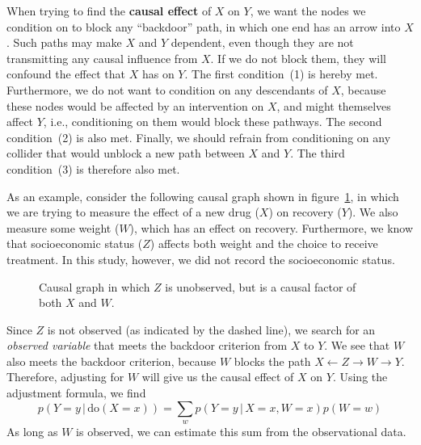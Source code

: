 \documentclass{article}
\newcommand{\giv}{\,|\,}
\begin{document}
\noindent When trying to find the \textbf{causal effect} of $X$ on $Y$, we want the nodes we condition on to block any ``backdoor'' path, in which one end has an arrow into $X$. Such paths may make $X$ and $Y$ dependent, even though they are not transmitting any causal influence from $X$. If we do not block them, they will confound the effect that $X$ has on $Y$. The first condition~(1) is hereby met. Furthermore, we do not want to condition on any descendants of $X$, because these nodes would be affected by an intervention on $X$, and might themselves affect $Y$, i.e., conditioning on them would block these pathways. The second condition~(2) is also met. Finally, we should refrain from conditioning on any collider that would unblock a new path between $X$ and $Y$. The third condition~(3) is therefore also met. 

As an example, consider the following causal graph shown in figure~\ref{fig:causal}, in which we are trying to measure the effect of a new drug ($X$) on recovery ($Y$). We also measure some weight ($W$), which has an effect on recovery. Furthermore, we know that socioeconomic status ($Z$) affects both weight and the choice to receive treatment. In this study, however, we did not record the socioeconomic status. 

\begin{figure}[H]
    \centering
    
    \caption{Causal graph in which $Z$ is unobserved, but is a causal factor of both $X$ and $W$. }
    \label{fig:causal}
\end{figure}

\noindent Since $Z$ is not observed (as indicated by the dashed line), we search for an \textit{observed variable} that meets the backdoor criterion from $X$ to $Y$. We see that $W$ also meets the backdoor criterion, because $W$ blocks the path $X \leftarrow Z \rightarrow W \rightarrow Y$. Therefore, adjusting for $W$ will give us the causal effect of $X$ on $Y$. Using the adjustment formula, we find
$$
    p(Y=y \giv \text{do}(X=x)) = \sum_w p(Y=y \giv X=x, W=x)p(W=w)
$$
\noindent As long as $W$ is observed, we can estimate this sum from the observational data. 
\end{document}
